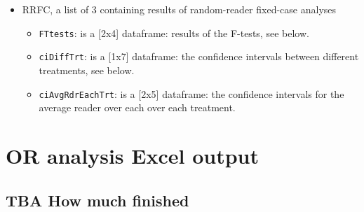 \documentclass[
]{book}
\newenvironment{Shaded}{\begin{snugshade}}{\end{snugshade}}
\newcommand{\CommentTok}[1]{\textcolor[rgb]{0.56,0.35,0.01}{\textit{#1}}}
\newcommand{\NormalTok}[1]{#1}
\newcommand{\OperatorTok}[1]{\textcolor[rgb]{0.81,0.36,0.00}{\textbf{#1}}}
\providecommand{\tightlist}{%
  \setlength{\itemsep}{0pt}\setlength{\parskip}{0pt}}
\begin{document}
\begin{itemize}
\tightlist
\item
  RRFC, a list of 3 containing results of random-reader fixed-case analyses

  \begin{itemize}
  \tightlist
  \item
    \texttt{FTtests}: is a {[}2x4{]} dataframe: results of the F-tests, see below.
  \item
    \texttt{ciDiffTrt}: is a {[}1x7{]} dataframe: the confidence intervals between different treatments, see below.
  \item
    \texttt{ciAvgRdrEachTrt}: is a {[}2x5{]} dataframe: the confidence intervals for the average reader over each over each treatment.
  \end{itemize}
\end{itemize}

\begin{Shaded}
\end{Shaded}

\hypertarget{quick-start-or-excel}{%
\chapter{OR analysis Excel output}\label{quick-start-or-excel}}

\hypertarget{quick-start-or-excel-how-much-finished}{%
\section{TBA How much finished}\label{quick-start-or-excel-how-much-finished}}
\end{document}
